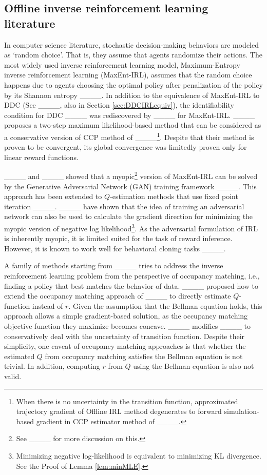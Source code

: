 \subsection{Offline inverse reinforcement learning literature} \; In computer science literature, stochastic decision-making behaviors are modeled as `random choice'. That is, they assume that agents randomize their actions. The most widely used inverse reinforcement learning model, Maximum-Entropy inverse reinforcement learning (MaxEnt-IRL), assumes that the random choice happens due to agents choosing the optimal policy after penalization of the policy by its Shannon entropy ____. In addition to the equivalence of MaxEnt-IRL to DDC (See ____, also in Section \ref{sec:DDCIRLequiv}), the identifiability condition for DDC ____ was rediscovered by ____ for MaxEnt-IRL. ____ proposes a two-step maximum likelihood-based method that can be considered as a conservative version of CCP method of ____\footnote{When there is no uncertainty in the transition function, approximated trajectory gradient of Offline IRL method degenerates to forward simulation-based gradient in CCP estimator method of ____.}.  
Despite that their method is proven to be convergent, its global convergence was limitedly proven only for linear reward functions.

____ and ____ showed that a myopic\footnote{See ____ for more discussion on this.} version of MaxEnt-IRL can be solved by the Generative Adversarial Network (GAN) training framework ____. This approach has been extended to $Q$-estimation methods that use fixed point iteration ____. ____ have shown that the idea of training an adversarial network can also be used to calculate the gradient direction for minimizing the myopic version of negative log likelihood\footnote{Minimizing negative log-likelihood is equivalent to minimizing KL divergence. See the Proof of Lemma \ref{lem:minMLE}.}. As the adversarial formulation of IRL is inherently myopic, it is limited suited for the task of reward inference. However, it is known to work well for behavioral cloning tasks ____. 

A family of methods starting from ____ tries to address the inverse reinforcement learning problem from the perspective of occupancy matching, i.e., finding a policy that best matches the behavior of data. ____ proposed how to extend the occupancy matching approach of ____ to directly estimate $Q$-function instead of $r$. Given the assumption that the Bellman equation holds, this approach allows a simple gradient-based solution, as the occupancy matching objective function they maximize becomes concave. ____ modifies ____ to conservatively deal with the uncertainty of transition function. Despite their simplicity, one caveat of occupancy matching approaches is that whether the estimated $Q$ from occupancy matching satisfies the Bellman equation is not trivial. %
In addition, computing $r$ from $Q$ using the Bellman equation is also not valid.